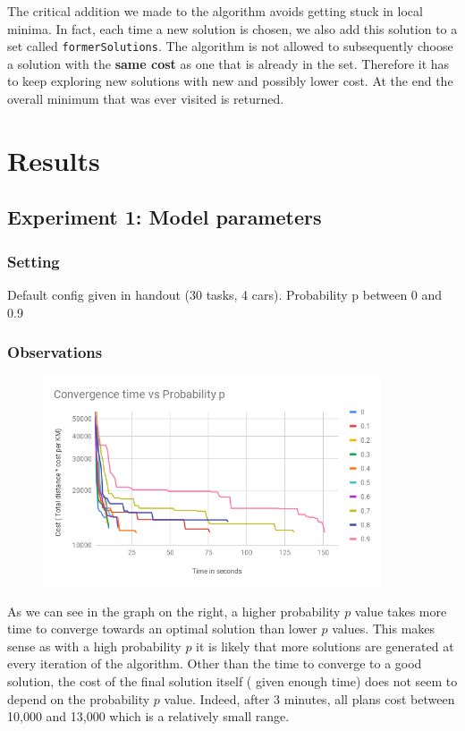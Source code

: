 \documentclass[11pt]{article}
\begin{document}
 The critical addition we made to the algorithm avoids getting stuck in local
 minima. In fact, each time a new solution is chosen, we also add this solution
 to a set called \texttt{formerSolutions}. The algorithm is not allowed to
 subsequently choose a solution with the \textbf{same cost} as one that is
 already in the set. Therefore it has to keep exploring new solutions with new
 and possibly lower cost. At the end the overall minimum that was ever visited is
 returned.


 \section{Results}

 \subsection{Experiment 1: Model parameters}

 \subsubsection{Setting}
 Default config given in handout (30 tasks, 4 cars). Probability p between 0 and 0.9
 \subsubsection{Observations}
 \begin{figure}
  \includegraphics[width=10cm]{convergence.png}
 \end{figure}
 As we can see in the graph on the right, a higher probability $p$ value takes more time to converge towards an optimal solution than lower $p$ values. This makes sense as with a high probability $p$ it is likely that more solutions are generated at every iteration of the algorithm. Other than the time to converge to a good solution, the cost of the final solution itself ( given enough time) does not seem to depend on the probability $p$ value. Indeed, after 3 minutes, all plans cost between 10,000 and 13,000 which is a relatively small range.
\end{document}

